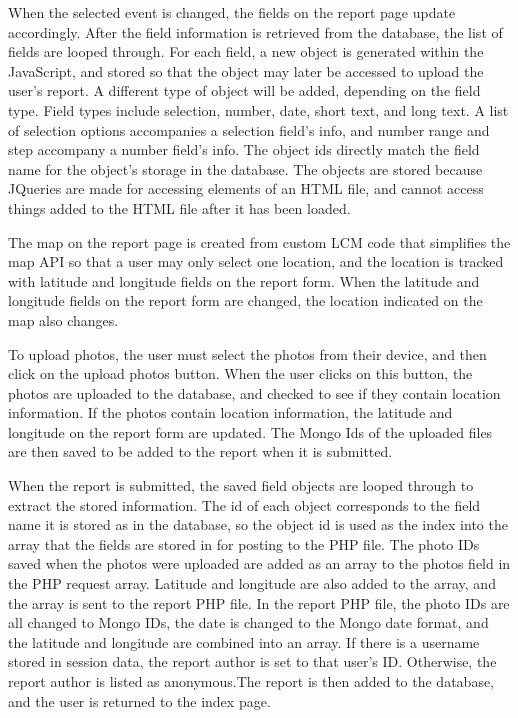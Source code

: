 When the selected event is changed, the fields on the report page update accordingly. After the field information is retrieved from the database, the list of fields are looped through. For each field, a new object is generated within the JavaScript, and stored so that the object may later be accessed to upload the user's report. A different type of object will be added, depending on the field type. Field types include selection, number, date, short text, and long text. A list of selection options accompanies a selection field's info, and number range and step accompany a number field's info. The object ids directly match the field name for the object's storage in the database. The objects are stored because JQueries are made for accessing elements of an HTML file, and cannot access things added to the HTML file after it has been loaded. 

The map on the report page is created from custom LCM code that simplifies the map API so that a user may only select one location, and the location is tracked with latitude and longitude fields on the report form. When the latitude and longitude fields on the report form are changed, the location indicated on the map also changes. 

To upload photos, the user must select the photos from their device, and then click on the upload photos button. When the user clicks on this button, the photos are uploaded to the database, and checked to see if they contain location information. If the photos contain location information, the latitude and longitude on the report form are updated. The Mongo Ids of the uploaded files are then saved to be added to the report when it is submitted.

When the report is submitted, the saved field objects are looped through to extract the stored information. The id of each object corresponds to the field name it is stored as in the database, so the object id is used as the index into the array that the fields are stored in for posting to the PHP file. The photo IDs saved when the photos were uploaded are added as an array to the photos field in the PHP request array. Latitude and longitude are also added to the array, and the array is sent to the report PHP file. In the report PHP file, the photo IDs are all changed to Mongo IDs, the date is changed to the Mongo date format, and the latitude and longitude are combined into an array. If there is a username stored in session data, the report author is set to that user's ID. Otherwise, the report author is listed as anonymous.The report is then added to the database, and the user is returned to the index page. 

